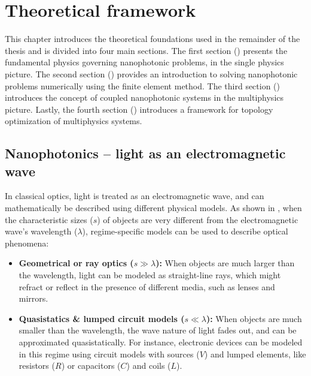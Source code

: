 \chapter{Theoretical framework}

This chapter introduces the theoretical foundations used in the remainder of
the thesis
and is divided into four main sections. The first section
() presents the fundamental physics
governing nanophotonic problems, in the single physics picture. The second
section () provides
an introduction to solving nanophotonic problems numerically using the
finite element method.
The third section () introduces the concept of coupled
nanophotonic systems in the multiphysics
picture. Lastly, the fourth section () introduces a
framework for topology optimization of multiphysics systems.




\section{Nanophotonics -- light as an electromagnetic
  wave}\label{sec:nanophotonics}

  In classical optics, light is treated as an electromagnetic wave, and can mathematically 
  be described using different physical models. As shown in ,
  when the characteristic sizes ($s$) of objects are very different from the electromagnetic wave's
  wavelength ($\lambda$),
  regime-specific models can be used to describe optical phenomena:
  \begin{itemize}
      \item \textbf{Geometrical or ray optics ($s \gg \lambda$):} When objects
   are much larger than the wavelength, light can be modeled as straight-line rays,
   which might refract or reflect in the presence of different media, such as
   lenses and mirrors.
      \item \textbf{Quasistatics \& lumped circuit models ($s \ll \lambda$):}
   When objects are much smaller than the wavelength, the wave nature of light
   fades out,
   and can be approximated quasistatically. For instance, electronic devices
   can be modeled in this regime using circuit models with sources ($V$) and lumped elements, 
   like resistors ($R$) or capacitors ($C$) and coils ($L$).
  \end{itemize}

